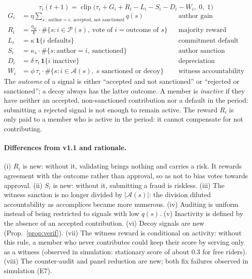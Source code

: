 \documentclass[11pt,a4paper]{article}
\theoremstyle{plain}
\theoremstyle{definition}
\theoremstyle{remark}
\newcommand{\clip}{\operatorname{clip}}
\newcommand{\1}{\mathbf{1}}
\begin{document}
\begin{equation}
\boxed{\tau_i(t+1)=\clip\bigl(\tau_i+G_i+R_i-L_i-S_i-D_i-W_i,\;0,\;1\bigr)}
\label{eq:dyn}
\end{equation}
\begin{align}
G_i&=\eta\textstyle\sum_{s\,:\,\text{author}=i,\ \text{accepted, not sanctioned}}q(s)
  &&\text{author gain}\label{eq:G}\\
R_i&=\tfrac{\eta_W}{k}\cdot\#\{s: i\in\mathcal{P}(s),\ \text{vote of } i=\text{outcome of } s\}
  &&\text{majority reward}\label{eq:R}\\
L_i&=\kappa\,\1\{i\text{ defaults}\}&&\text{commitment default}\label{eq:L}\\
S_i&=\kappa_s\cdot\#\{s:\text{author}=i,\ \text{sanctioned}\}&&\text{author sanction}\label{eq:S}\\
D_i&=\delta\,\tau_i\,\1\{i\text{ inactive}\}&&\text{depreciation}\label{eq:D}\\
W_i&=\phi\,\tau_i\cdot\#\{s: i\in\mathcal{A}(s),\ s\text{ sanctioned or decoy}\}
  &&\text{witness accountability}\label{eq:W}
\end{align}
The \emph{outcome} of a signal is either ``accepted and not sanctioned'' or
``rejected or sanctioned''; a decoy always has the latter outcome. A member is
\emph{inactive} if they have neither an accepted, non-sanctioned contribution
nor a default in the period: submitting a rejected signal is not enough to
remain active. The reward $R_i$ is only paid to a member who is active in the
period: it cannot compensate for not contributing.

\paragraph{Differences from v1.1 and rationale.} (i) $R_i$ is new: without it,
validating brings nothing and carries a risk. It rewards agreement with the
outcome rather than approval, so as not to bias votes towards approval.
(ii) $S_i$ is new: without it, submitting a fraud is riskless. (iii) The
witness sanction is no longer divided by $|\mathcal{A}(s)|$: the division
diluted accountability as accomplices became more numerous. (iv) Auditing is
uniform instead of being restricted to signals with low $q(s)$.
(v) Inactivity is defined by the absence of an accepted contribution.
(vi) Decoy signals are new (Prop.~\ref{prop:verif}). (vii) The witness reward
is conditional on activity: without this rule, a member who never contributes
could keep their score by serving only as a witness (observed in simulation:
stationary score of about $0.3$ for free riders). (viii) The counter-audit and
panel reduction are new; both fix failures observed in simulation (E7).
\end{document}
